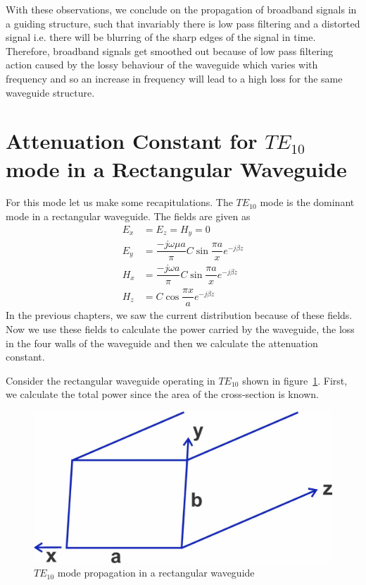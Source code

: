 With these observations, we conclude on the propagation of broadband signals in a guiding structure, such that invariably there is low pass filtering and a distorted signal i.e. there will be blurring of the sharp edges of the signal in time. Therefore, broadband signals get smoothed out because of low pass filtering action caused by the lossy behaviour of the waveguide which varies with frequency and so an increase in frequency will lead to a high loss for the same waveguide structure.

\section{Attenuation Constant for $TE_{10}$ mode in a Rectangular Waveguide}
For this mode let us make some recapitulations. The $TE_{10}$ mode is the dominant mode in a rectangular waveguide. The fields are given as
\begin{align}
E_{x} &= E_{z} = H_{y} = 0\\
E_{y} &= \dfrac{-j\omega\mu a }{\pi}C\sin \dfrac{\pi a}{x} e ^{-j\beta z}\label{eqn:eyrecte10}\\
H_{x} &= \dfrac{-j\omega a}{\pi} C \sin\dfrac{\pi a}{x}
e^{-j\beta z}\label{eqn:hxrecte10}\\
H_{z} &= C\cos \dfrac{\pi x}{a} e^{-j\beta z}\label{eqn:hzrecte10}
\end{align}
In the previous chapters, we saw the current distribution because of these fields. Now we use these fields to calculate the power carried by the waveguide, the loss in the four walls of the waveguide and then we calculate the attenuation constant.

Consider the rectangular waveguide operating in $TE_{10}$ shown in figure~\ref{fig:lectureimage21}. First, we calculate the total power since the area of the cross-section is known.
\begin{figure}[H]
\centering
\includegraphics[width=1\linewidth]{./graphics/lecture-image-21.jpg}
\caption{$TE_{10}$ mode propagation in a rectangular waveguide}
\label{fig:lectureimage21}
\end{figure}

